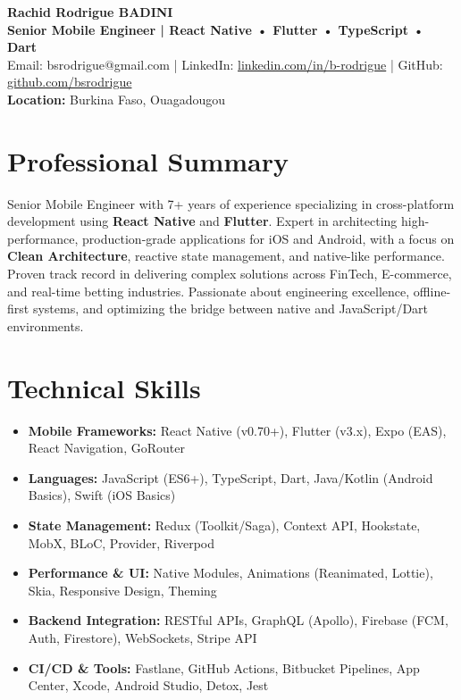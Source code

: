 \documentclass[a4paper,10pt]{article}
\begin{document}
\begin{center}
    {\LARGE\bfseries Rachid Rodrigue BADINI} \\[0.15cm]
    \textbf{Senior Mobile Engineer | React Native • Flutter • TypeScript • Dart} \\
    Email: bsrodrigue@gmail.com | LinkedIn: \href{https://linkedin.com/in/b-rodrigue}{linkedin.com/in/b-rodrigue} | GitHub: \href{https://github.com/bsrodrigue}{github.com/bsrodrigue} \\
    \textbf{Location:} Burkina Faso, Ouagadougou
\end{center}

\vspace{0.1cm}

\section*{Professional Summary}
Senior Mobile Engineer with 7+ years of experience specializing in cross-platform development using \textbf{React Native} and \textbf{Flutter}. Expert in architecting high-performance, production-grade applications for iOS and Android, with a focus on \textbf{Clean Architecture}, reactive state management, and native-like performance. Proven track record in delivering complex solutions across FinTech, E-commerce, and real-time betting industries. Passionate about engineering excellence, offline-first systems, and optimizing the bridge between native and JavaScript/Dart environments.

\section*{Technical Skills}
\begin{itemize}[leftmargin=*,nosep]
    \item \textbf{Mobile Frameworks:} React Native (v0.70+), Flutter (v3.x), Expo (EAS), React Navigation, GoRouter
    \item \textbf{Languages:} JavaScript (ES6+), TypeScript, Dart, Java/Kotlin (Android Basics), Swift (iOS Basics)
    \item \textbf{State Management:} Redux (Toolkit/Saga), Context API, Hookstate, MobX, BLoC, Provider, Riverpod
    \item \textbf{Performance \& UI:} Native Modules, Animations (Reanimated, Lottie), Skia, Responsive Design, Theming
    \item \textbf{Backend Integration:} RESTful APIs, GraphQL (Apollo), Firebase (FCM, Auth, Firestore), WebSockets, Stripe API
    \item \textbf{CI/CD \& Tools:} Fastlane, GitHub Actions, Bitbucket Pipelines, App Center, Xcode, Android Studio, Detox, Jest
\end{itemize}
\end{document}
